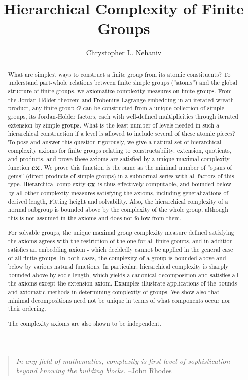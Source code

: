 \documentclass[a4paper,11pt]{amsart}
\title{Hierarchical Complexity of Finite Groups}
\author{Chrystopher L. Nehaniv}
\theoremstyle{definition}
\newcommand{\cx}{\mbox{\bf cx}}
\newcommand{\1}{{\mathbf 1}}
\begin{document}
    \maketitle
 \begin{quote}
   {\small  {\it  In any field of mathematics, complexity is first level of sophistication beyond knowing the building blocks.} 
     --John Rhodes}
 \end{quote}
\begin{abstract} 
 What are simplest ways to construct a finite group from its atomic constituents?   To understand part-whole relations between finite simple groups (``atoms'') and the global structure of finite groups, we axiomatize complexity measures on finite groups.  
From the Jordan-Hölder theorem and Frobenius-Lagrange embedding in an iterated wreath product, any finite group $G$ can be constructed from a unique collection of simple groups, its Jordan-H\"{o}lder factors, each with well-defined multiplicities through iterated extension by simple groups.  What is the least number of levels needed in such a hierarchical construction if a level is allowed to include several of these atomic pieces? 
To pose and answer this question rigorously, we give a natural set of hierarchical complexity axioms for finite groups relating to constructability, extension, quotients, and products, and prove these axioms are satisfied by a unique maximal complexity function $\cx$. 
We prove this function is the same as the minimal number of ``spans of gems'' (direct products of simple groups) in a subnormal series with all factors of this type. Hierarchical complexity $\cx$ is thus effectively computable, and bounded below by all other complexity measures satisfying the axioms, including generalizations of derived length, Fitting height and solvability.  Also, the hierarchical complexity of a normal subgroup is bounded above by the complexity of the whole group, although this is not assumed in the axioms and does not follow from them.

For solvable groups, the unique maximal group complexity measure defined satisfying the axioms agrees with the restriction of the one for all finite groups, and in addition satisfies an embedding axiom - which decidedly cannot be applied in the general case of all finite groups.  In both cases, the complexity of a group is bounded above and below by various natural functions. In particular, hierarchical complexity is sharply bounded above by socle length, which yields a canonical decomposition and satisfies all the axioms except the extension axiom. 
 Examples illustrate applications of the bounds and axiomatic methods in determining complexity of groups. We show also that minimal decompositions need not be unique in terms of what components occur nor their ordering. 

The complexity axioms are also shown to be independent. 
\end{abstract}
\end{document}
